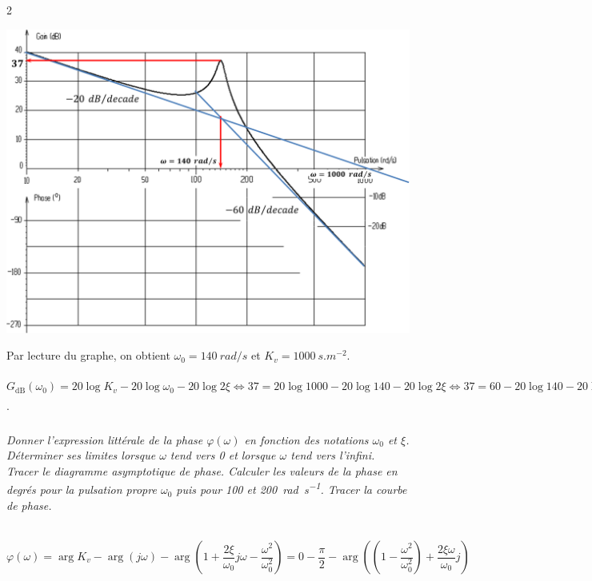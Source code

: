 \documentclass[10pt,fleqn]{article} %
\begin{document}
\begin{multicols}{2}
\begin{corrige}
\begin{center}
\includegraphics[width=\linewidth]{images/cor_01}
\end{center}
Par lecture du graphe, on obtient $\omega_0=\SI{140}{rad/s}$ et $K_v=\SI{1000}{s.m^{-2}}$.

$G_{\text{dB}}\left(\omega_0 \right)=
20\log K_v- 20\log  \omega_0 - 20\log 2\xi 
\Leftrightarrow 37=20\log 1000 - 20\log  140 - 20\log 2\xi
\Leftrightarrow 37=60 - 20\log  140 - 20\log 2\xi
\Leftrightarrow \dfrac{37-60 + 20\log  140}{-20} =\log 2\xi
\Leftrightarrow  \xi \simeq 0,05
$.

\end{corrige}


\subparagraph{}\textit{Donner l’expression littérale de la phase $\varphi(\omega)$ en fonction des notations $\omega_0$ et $\xi$.	
Déterminer ses limites lorsque $\omega$ tend vers 0 et lorsque $\omega$ tend vers l'infini.	
Tracer le diagramme asymptotique de phase.	
Calculer les valeurs de la phase en degrés pour la pulsation propre $\omega_0$ puis pour \num{100} et \SI{200}{rad.s^{-1}}. Tracer la courbe de phase.}

\begin{corrige} ~\\

$
\varphi\left(  \omega\right)
=\arg K_v- \arg \left( j\omega\right) - \arg  \left( 1+\dfrac{2\xi}{\omega_0} j\omega - \dfrac{\omega^2}{\omega_0^2}  \right)
=0-\dfrac{\pi}{2} - \arg  \left( \left( 1 - \dfrac{\omega^2}{\omega_0^2}\right) + \dfrac{2\xi\omega}{\omega_0} j \right)
$


\end{corrige}
\end{multicols}
\end{document}
